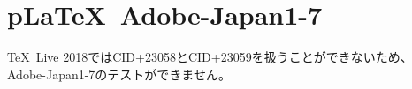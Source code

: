 \documentclass{jsarticle}
\begin{document}
\section{p\LaTeX~Adobe-Japan1-7}

\TeX~Live 2018ではCID+23058とCID+23059を扱うことができないため、
Adobe-Japan1-7のテストができません。


\end{document}
